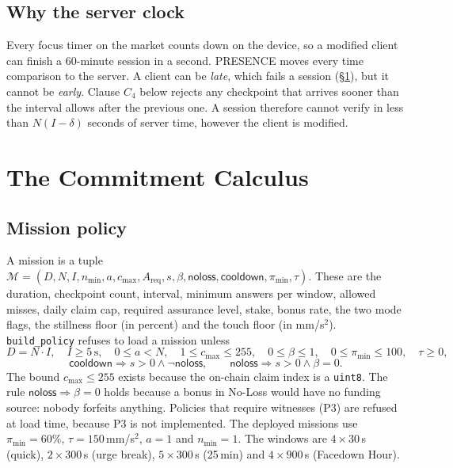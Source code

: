 \documentclass[10pt]{article}
\newcommand{\code}[1]{\texttt{\small #1}}
\begin{document}
\subsection{Why the server clock}
Every focus timer on the market counts down on the device, so a modified client can finish a 60-minute session in a
second. PRESENCE moves every time comparison to the server. A client can be \emph{late}, which fails a session
(\S\ref{sec:calculus}), but it cannot be \emph{early}. Clause $C_4$ below rejects any checkpoint that arrives sooner than
the interval allows after the previous one. A session therefore cannot verify in less than $N(I-\delta)$ seconds of
server time, however the client is modified.

\section{The Commitment Calculus}\label{sec:calculus}

\subsection{Mission policy}
A mission is a tuple $\mathcal{M}=(D, N, I, n_{\min}, a, c_{\max}, A_{\text{req}}, s, \beta, \textsf{noloss},
\textsf{cooldown}, \pi_{\min}, \tau)$. These are the duration, checkpoint count, interval, minimum answers per window,
allowed misses, daily claim cap, required assurance level, stake, bonus rate, the two mode flags, the stillness floor
(in percent) and the touch floor (in mm/s$^2$). \code{build\_policy} refuses to load a mission unless
\begin{equation}\label{eq:policy}
D = N\cdot I,\quad I\ge 5\,\text{s},\quad 0\le a < N,\quad 1\le c_{\max}\le 255,\quad 0\le\beta\le 1,\quad
0\le\pi_{\min}\le 100,\quad \tau\ge 0,
\end{equation}
\begin{equation}\label{eq:modes}
\textsf{cooldown}\Rightarrow s>0\wedge\neg\textsf{noloss},\qquad \textsf{noloss}\Rightarrow s>0\wedge\beta=0 .
\end{equation}
The bound $c_{\max}\le255$ exists because the on-chain claim index is a \code{uint8}. The rule $\textsf{noloss}\Rightarrow\beta=0$
holds because a bonus in No-Loss would have no funding source: nobody forfeits anything. Policies that require
witnesses (P3) are refused at load time, because P3 is not implemented. The deployed missions use $\pi_{\min}=60\%$,
$\tau=150$\,mm/s$^2$, $a=1$ and $n_{\min}=1$. The windows are $4\times30$\,s (quick), $2\times300$\,s (urge break),
$5\times300$\,s (25\,min) and $4\times900$\,s (Facedown Hour).
\end{document}
